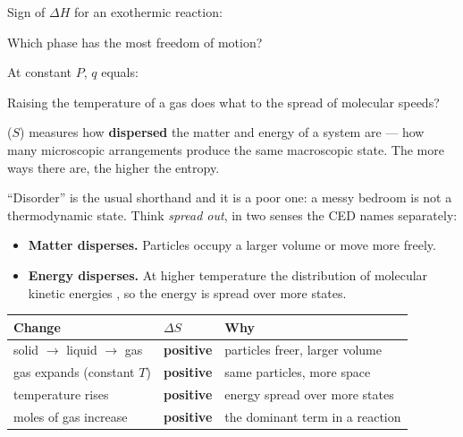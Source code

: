 \documentclass{apchem-notes}
\begin{document}

\begin{warmup}[4]
  \item Sign of $\Delta H$ for an exothermic reaction:
  \item Which phase has the most freedom of motion?
  \item At constant $P$, $q$ equals: 
  \item Raising the temperature of a gas does what to the spread of
        molecular speeds? 
\end{warmup}



 ($S$) measures how \textbf{dispersed} the matter and energy
of a system are --- how many microscopic arrangements produce the same
macroscopic state. The more ways there are, the higher the entropy.

``Disorder'' is the usual shorthand and it is a poor one: a messy bedroom is
not a thermodynamic state. Think \emph{spread out}, in two senses the CED
names separately:

\begin{itemize}[leftmargin=*,itemsep=0.3em]
  \item \textbf{Matter disperses.} Particles occupy a larger volume or move
        more freely.
  \item \textbf{Energy disperses.} At higher temperature the distribution of
        molecular kinetic energies , so the
        energy is spread over more states.
\end{itemize}


\begin{center}
\begin{tabular}{@{}lll@{}}
\hline
\textbf{Change} & \textbf{$\Delta S$} & \textbf{Why} \\
\hline
solid $\to$ liquid $\to$ gas & \textbf{positive} & particles freer, larger
  volume \\
gas expands (constant $T$) & \textbf{positive} & same particles, more space
  \\
temperature rises & \textbf{positive} & energy spread over more states \\
moles of gas increase & \textbf{positive} & the dominant term in a
  reaction \\
\hline
\end{tabular}
\end{center}
\end{document}
